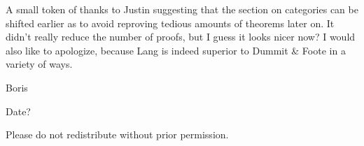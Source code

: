 A small token of thanks to Justin
suggesting that the section on categories can be shifted earlier
as to avoid reproving tedious amounts of theorems later on.
It didn't really reduce the number of proofs,
but I guess it looks nicer now?
I would also like to apologize,
because Lang is indeed superior to Dummit \& Foote in a variety of ways.

\medskip

Boris

Date?

\vspace{5mm}

Please do not redistribute without prior permission.
